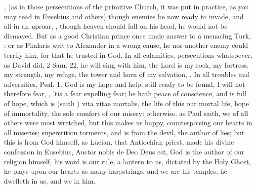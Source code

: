 {, (as in those persecutions of the primitive
Church, it was put in practice, as you may read in Eusebius and others)
though enemies be now ready to invade, and all in an uproar, , though heaven should
fall on his head, he would not be dismayed. But as a good Christian
prince once made answer to a menacing Turk, : or as  Phalaris writ
to Alexander in a wrong cause, he nor another enemy could terrify%
him, for that he trusted in God.  In
all calamities, persecutions whatsoever, as David did, 2 Sam.  22,
he will sing with him, the Lord is my rock, my fortress, my strength,
my refuge, the tower and horn of my salvation, \etc{}. In all troubles and
adversities, Psal.  1. God is my hope and help, still ready to be
found, I will not therefore fear, \etc{}, 'tis a fear expelling fear; he
hath peace of conscience, and is full of hope, which is (saith
\Austin{}) vita vitae mortalis, the life of this our mortal life,
hope of immortality, the sole comfort of our misery: otherwise, as Paul
saith, we of all others were most wretched, but this makes us happy,
counterpoising our hearts in all miseries; superstition torments, and
is from the devil, the author of lies; but this is from God himself, as
Lucian, that Antiochian priest, made his divine confession in
Eusebius, Auctor nobis de Deo Deus est, God is the author of our
religion himself, his word is our rule, a lantern to us, dictated by
the Holy Ghost, he plays upon our hearts as many harpstrings, and we
are his temples, he dwelleth in us, and we in him.

}
